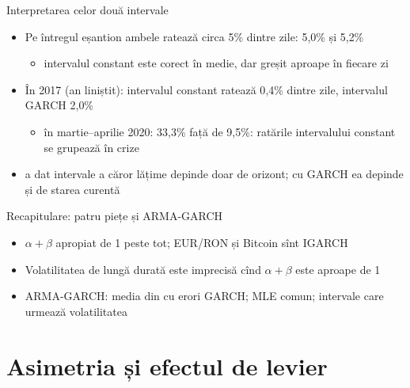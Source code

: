 \begin{frame}{Interpretarea celor două intervale}
\itemsize{\small}
\begin{itemize}
    \item Pe întregul eșantion ambele ratează circa 5\% dintre zile: 5{,}0\% și 5{,}2\%
    \begin{itemize}
        \item intervalul constant este corect în medie, dar greșit aproape în fiecare zi
    \end{itemize}
    \item În 2017 (an liniștit): intervalul constant ratează 0{,}4\% dintre zile, intervalul GARCH 2{,}0\%
    \begin{itemize}
        \item în martie--aprilie 2020: 33{,}3\% față de 9{,}5\%: ratările intervalului constant se grupează în crize
    \end{itemize}
    \item {} a dat intervale a căror lățime depinde doar de orizont; cu GARCH ea depinde și de starea curentă
\end{itemize}
\end{frame}

\begin{frame}{Recapitulare: patru piețe și ARMA-GARCH}
\itemsize{\small}
\begin{itemize}
    \item $\alpha + \beta$ apropiat de 1 peste tot; EUR/RON și Bitcoin sînt IGARCH
    \item Volatilitatea de lungă durată este imprecisă cînd $\alpha + \beta$ este aproape de 1
    \item ARMA-GARCH: media din  cu erori GARCH; MLE comun; intervale care urmează volatilitatea
\end{itemize}
\end{frame}


\section{Asimetria și efectul de levier}

